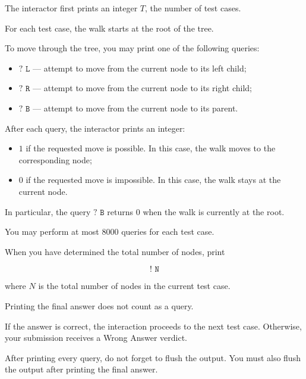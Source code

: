 The interactor first prints an integer $T$, the number of test cases.

For each test case, the walk starts at the root of the tree.

To move through the tree, you may print one of the following queries:

\begin{itemize}
\item $\texttt{? L}$ --- attempt to move from the current node to its left child;
\item $\texttt{? R}$ --- attempt to move from the current node to its right child;
\item $\texttt{? B}$ --- attempt to move from the current node to its parent.
\end{itemize}

After each query, the interactor prints an integer:

\begin{itemize}
\item $1$ if the requested move is possible. In this case, the walk moves to the corresponding node;
\item $0$ if the requested move is impossible. In this case, the walk stays at the current node.
\end{itemize}

In particular, the query $\texttt{? B}$ returns $0$ when the walk is currently at the root.

You may perform at most $8000$ queries for each test case.

When you have determined the total number of nodes, print

$$\texttt{! N}$$

where $N$ is the total number of nodes in the current test case.

Printing the final answer does not count as a query.

If the answer is correct, the interaction proceeds to the next test case. Otherwise, your submission receives a Wrong Answer verdict.

After printing every query, do not forget to flush the output. You must also flush the output after printing the final answer.
